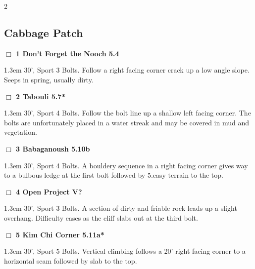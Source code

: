 \begin{multicols}{2}
\subsection*{Cabbage Patch}\label{bf:Cabbage Patch}
\needspace{2em}
\label{rt:Don't Forget the Nooch}
\colorbox{green!20}{
\parbox{0.95\linewidth}{
\hspace{-1ex}\textbf{$\Box$
1 Don't Forget the Nooch 5.4  
}}}
\begin{adjustwidth}{1.3em}{}			
30', Sport 3 Bolts. Follow a right facing corner crack up a low angle slope. Seeps in spring, usually dirty.
\end{adjustwidth}
\needspace{2em}
\label{rt:Tabouli}
\colorbox{green!20}{
\parbox{0.95\linewidth}{
\hspace{-1ex}\textbf{$\Box$
2 Tabouli 5.7*  
}}}
\begin{adjustwidth}{1.3em}{}			
30', Sport 4 Bolts. Follow the bolt line up a shallow left facing corner. The bolts are unfortunately placed in a water streak and may be covered in mud and vegetation.
\end{adjustwidth}
\needspace{2em}
\label{rt:Babaganoush}
\colorbox{RoyalBlue!20}{
\parbox{0.95\linewidth}{
\hspace{-1ex}\textbf{$\Box$
3 Babaganoush 5.10b  
}}}
\begin{adjustwidth}{1.3em}{}			
30', Sport 4 Bolts. A bouldery sequence in a right facing corner gives way to a bulbous ledge at the first bolt followed by 5.easy terrain to the top.
\end{adjustwidth}
\needspace{2em}
\label{rt:cliffs_proj_5}
\colorbox{black!20}{
\parbox{0.95\linewidth}{
\hspace{-1ex}\textbf{$\Box$
4 Open Project V?  
}}}
\begin{adjustwidth}{1.3em}{}			
30', Sport 3 Bolts. A section of dirty and friable rock leads up a slight overhang. Difficulty eases as the cliff slabs out at the third bolt.
\end{adjustwidth}
\needspace{2em}
\label{rt:Kim Chi Corner}
\colorbox{RoyalBlue!20}{
\parbox{0.95\linewidth}{
\hspace{-1ex}\textbf{$\Box$
5 Kim Chi Corner 5.11a*  
}}}
\begin{adjustwidth}{1.3em}{}			
30', Sport 5 Bolts. Vertical climbing follows a 20' right facing corner to a horizontal seam followed by slab to the top.
\end{adjustwidth}
	\end{multicols}
